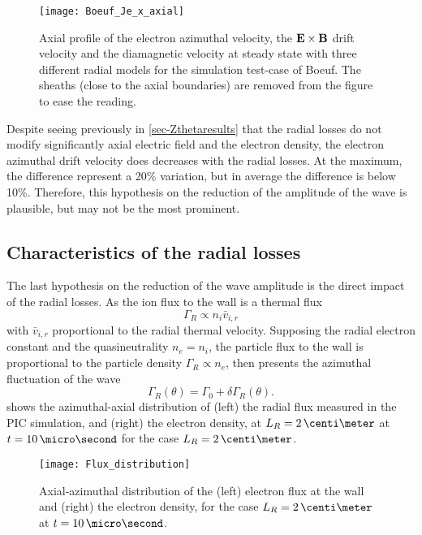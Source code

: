    
  \begin{figure}[hbt]
    \centering
    \texttt{[image: Boeuf\_Je\_x\_axial]}
    \caption{Axial profile of the electron azimuthal velocity, the ${\mathbf E} \times {\mathbf B}$ drift velocity and the diamagnetic velocity at steady state with three different radial models for the simulation test-case of Boeuf. The sheaths (close to the axial boundaries) are removed from the figure to ease the reading.}
    \label{fig-Jetheta}
  \end{figure}

  Despite seeing previously in \cref{sec-Zthetaresults} that the radial losses do not modify significantly axial electric field and the electron density, the electron azimuthal drift velocity does decreases with the radial losses. 
  At the maximum, the difference represent a 20\% variation, but in average the difference is below 10\%.
  Therefore, this hypothesis on the reduction of the amplitude of the wave is plausible, but may not be the most prominent.

\FloatBarrier


\subsection{Characteristics of the radial losses}

The last hypothesis on the reduction of the wave amplitude is the direct impact of the radial losses.
As the ion flux to the wall is a thermal flux
\[ \Gamma_R \propto n_i \bar{v}_{i, r} \]
with $\bar{v}_{i, r}$ proportional to the radial thermal velocity.
Supposing the radial electron constant and the quasineutrality $n_e=n_i$, the particle flux to the wall is proportional to the particle density $\Gamma_R \propto n_e$, then presents the azimuthal fluctuation of the wave
\[ \Gamma_R(\theta) = \Gamma_0 + \delta \Gamma_R(\theta). \]
 shows the azimuthal-axial distribution of (left) the radial flux measured in the \ac{PIC} simulation, and (right) the electron density, at $L_R=2\,\centi\meter$ at $t=10\,\micro\second$ for the case $L_R=2\,\centi\meter$.

\begin{figure}[hbtp]
  \centering
  \texttt{[image: Flux\_distribution]}
  \caption{Axial-azimuthal distribution of the (left) electron flux at the wall and (right) the electron density, for the case $L_R=2\,\centi\meter$ at $t=10\,\micro\second$.}
  \label{fig-rfluxs}
\end{figure}

